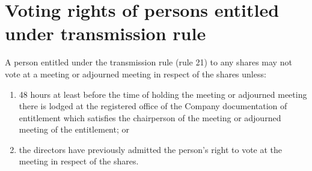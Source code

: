 \section{Voting rights of persons entitled under transmission rule}

A person entitled under the transmission rule (rule 21) to any shares may not vote at a meeting or adjourned meeting in respect of the shares unless:

\begin{enumerate}[label=(\alph*)]
    \item 48 hours at least before the time of holding the meeting or adjourned meeting there is lodged at the registered office of the Company documentation of entitlement which satisfies the chairperson of the meeting or adjourned meeting of the entitlement; or
    
    \item the directors have previously admitted the person's right to vote at the meeting in respect of the shares.
\end{enumerate} 
